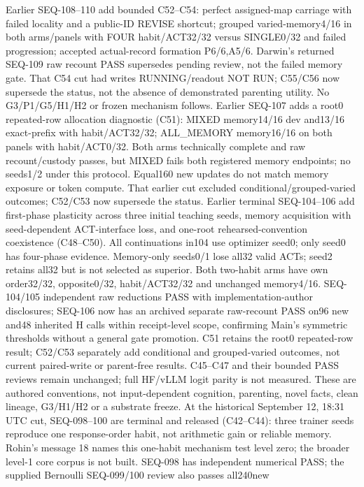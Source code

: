 \documentclass[11pt]{article}
\begin{document}
Earlier SEQ-108--110 add bounded C52--C54:
perfect assigned-map carriage with failed locality and a public-ID REVISE shortcut;
grouped varied-memory4/16 in both arms/panels with FOUR habit/ACT32/32 versus
SINGLE0/32 and failed progression; accepted actual-record formation P6/6,A5/6.
Darwin's returned SEQ-109 raw recount PASS supersedes pending review, not the
failed memory gate. That C54 cut had writes RUNNING/readout NOT RUN; C55/C56
now supersede the status, not the absence of demonstrated parenting utility. No G3/P1/G5/H1/H2 or frozen mechanism follows.
Earlier SEQ-107 adds a root0 repeated-row
allocation diagnostic (C51): MIXED memory14/16 dev and13/16 exact-prefix with
habit/ACT32/32; ALL\_MEMORY memory16/16 on both panels with habit/ACT0/32.
Both arms technically complete and raw recount/custody passes, but MIXED fails
both registered memory endpoints; no seeds1/2 under this protocol. Equal160
new updates do not match memory exposure or token compute. That earlier cut
excluded conditional/grouped-varied outcomes; C52/C53 now supersede the status. Earlier terminal SEQ-104--106 add first-phase
plasticity across three initial teaching seeds, memory acquisition with
seed-dependent ACT-interface loss, and one-root rehearsed-convention coexistence
(C48--C50). All continuations in104 use optimizer seed0; only seed0 has four-phase
evidence. Memory-only seeds0/1 lose all32 valid ACTs; seed2 retains all32 but is
not selected as superior. Both two-habit arms have own order32/32, opposite0/32,
habit/ACT32/32 and unchanged memory4/16. SEQ-104/105 independent raw reductions
PASS with implementation-author disclosures; SEQ-106 now has an archived
separate raw-recount PASS on96 new and48 inherited H calls within receipt-level
scope, confirming Main's symmetric thresholds without a general gate promotion.
C51 retains the root0 repeated-row result; C52/C53 separately add conditional
and grouped-varied outcomes, not current paired-write or parent-free results.
C45--C47 and their bounded PASS reviews remain unchanged; full HF/vLLM logit
parity is not measured. These are authored conventions, not input-dependent
cognition, parenting, novel facts, clean lineage, G3/H1/H2 or a substrate freeze.
At the historical September 12, 18:31 UTC cut, SEQ-098--100 are terminal and released (C42--C44):
three trainer seeds reproduce one response-order habit, not arithmetic gain
or reliable memory. Rohin's message 18 names this one-habit mechanism test
level zero; the broader level-1 core corpus is not built. SEQ-098 has independent
numerical PASS; the supplied Bernoulli SEQ-099/100 review also passes all240new
\end{document}
